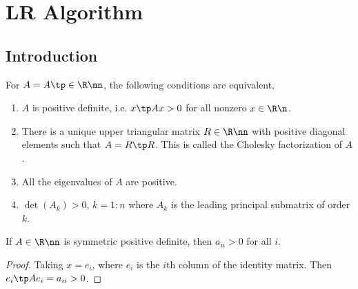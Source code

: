 \section{LR Algorithm}
%

\subsection{Introduction} \label{sec.lr-intro}
\begin{theorem} \label{thm.chol}
For $A = A\tp \in\R\nn$, the following conditions are equivalent,
\begin{enumerate}[label=\upshape(\alph*)]
\item
$A$ is positive definite, i.e. $x\tp A x > 0$ for all nonzero $x\in\R\n$.
\item
There is a unique upper triangular matrix $R\in\R\nn$ with positive
diagonal elements such that $A = R\tp R$. This is called the Cholesky
factorization of $A$.
\item
All the eigenvalues of $A$ are positive.
\item
$\det(A_{k}) > 0$, $k = 1\colon n$ where $A_{k}$ is the leading principal
submatrix of order $k$.
\end{enumerate}
\end{theorem}

\begin{proposition}\label{prop.diag-posi}
If $A\in\R\nn$ is symmetric positive definite, then $a_{ii} > 0$ for all $i$.
\end{proposition}
\begin{proof}
Taking $x = e_{i}$, where $e_{i}$ is the $i$th column of the identity
matrix. Then $e_{i}\tp A e_{i} = a_{ii} > 0$.
\end{proof}



